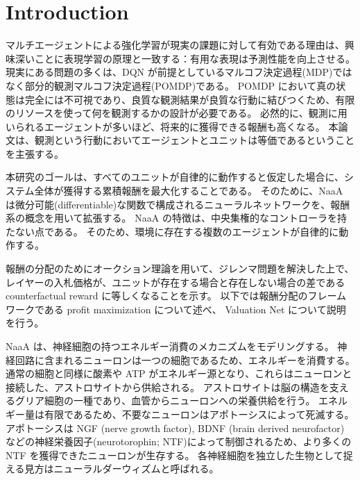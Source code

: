 \section{Introduction}


マルチエージェントによる強化学習が現実の課題に対して有効である理由は、興味深いことに表現学習の原理と一致する：有用な表現は予測性能を向上させる。
現実にある問題の多くは、DQN が前提としているマルコフ決定過程(MDP)ではなく部分的観測マルコフ決定過程(POMDP)である\citep[p.258]{sutton1998reinforcement}。
POMDP において真の状態は完全には不可視であり、良質な観測結果が良質な行動に結びつくため、有限のリソースを使って何を観測するかの設計が必要である。
必然的に、観測に用いられるエージェントが多いほど、将来的に獲得できる報酬も高くなる。
本論文は、観測という行動においてエージェントとユニットは等価であるということを主張する。


本研究のゴールは、すべてのユニットが自律的に動作すると仮定した場合に、システム全体が獲得する累積報酬を最大化することである。
そのために、NaaA は微分可能(differentiable)な関数で構成されるニューラルネットワークを、報酬系の概念を用いて拡張する。
NaaA の特徴は、中央集権的なコントローラを持たない点である。
そのため、環境に存在する複数のエージェントが自律的に動作する。

報酬の分配のためにオークション理論を用いて、ジレンマ問題を解決した上で、
レイヤーの入札価格が、ユニットが存在する場合と存在しない場合の差である counterfactual reward \citep{agogino2006quicr} に等しくなることを示す。
以下では報酬分配のフレームワークである profit maximization について述べ、
Valuation Net について説明を行う。

NaaA は、神経細胞の持つエネルギー消費のメカニズムをモデリングする。
神経回路に含まれるニューロンは一つの細胞であるため、エネルギーを消費する。
通常の細胞と同様に酸素や ATP がエネルギー源となり、これらはニューロンと接続した、アストロサイトから供給される。
アストロサイトは脳の構造を支えるグリア細胞の一種であり、血管からニューロンへの栄養供給を行う。
エネルギー量は有限であるため、不要なニューロンはアポトーシスによって死滅する。
アポトーシスは NGF (nerve growth factor), BDNF (brain derived neurofactor) などの神経栄養因子(neurotorophin; NTF)によって制御されるため、より多くの NTF を獲得できたニューロンが生存する。
各神経細胞を独立した生物として捉える見方はニューラルダーウィズム\citep{edelman1987neural}と呼ばれる。

